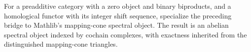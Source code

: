 \begin{definition}
  \label{def:mapping-cone-homological-image}
  \leanok
  For a preadditive category with a zero object and binary biproducts, and a
  homological functor with its integer shift sequence, specialize the preceding
  bridge to Mathlib's mapping-cone spectral object.  The result is an abelian
  spectral object indexed by cochain complexes, with exactness inherited from
  the distinguished mapping-cone triangles.
\end{definition}

